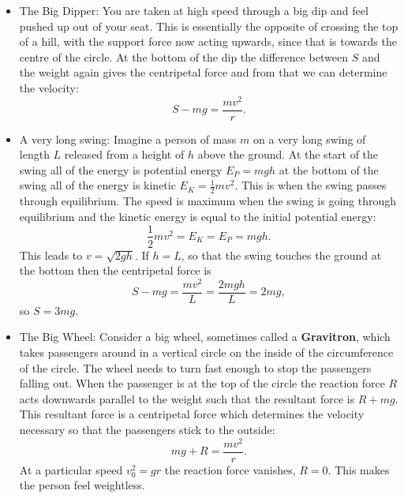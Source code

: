 \begin{itemize}
\setlength{\itemsep}{-5pt}
    \item The Big Dipper: You are taken at high speed through a big dip and feel pushed up out of your seat. This is essentially the opposite of crossing the top of a hill, with the support force now acting upwards, since that is towards the centre of the circle. At the bottom of the dip the difference between $S$ and the weight again gives the centripetal force and from that we can determine the velocity:
    \begin{equation*}
    S-mg=\frac{mv^{2}}{r}.
    \end{equation*}
    \item A very long swing: Imagine a person of mass $m$ on a very long swing of length $L$ released from a height of $h$ above the ground. At the start of the swing all of the energy is potential energy $E_{P}=mgh$ at the bottom of the swing all of the energy is kinetic $E_{K}=\frac{1}{2}mv^{2}$. This is when the swing passes through equilibrium. The speed is maximum when the swing is going through equilibrium and the kinetic energy is equal to the initial potential energy:
    \begin{equation*}
    \frac{1}{2}mv^{2}=E_{K}=E_{P}=mgh.
    \end{equation*}
This leads to $v=\sqrt{2gh}$.
If $h=L$, so that the swing touches the ground at the bottom then the centripetal force is
\begin{equation*}
S-mg=\frac{mv^{2}}{L}=\frac{2mgh}{L}=2mg,
\end{equation*}
so $S=3mg$.
\item The Big Wheel: Consider a big wheel, sometimes called a \textbf{Gravitron}, which takes passengers around in a vertical circle on the inside of the circumference of the circle. The wheel needs to turn fast enough to stop the passengers falling out. When the passenger is at the top of the circle the reaction force $R$ acts downwards parallel to the weight such that the resultant force is $R+mg$. This resultant force is a centripetal force which determines the velocity necessary so that the passengers stick to the outside:
\begin{equation*}
mg+R=\frac{mv^{2}}{r}.
\end{equation*}
At a particular speed $v_{0}^{2}=gr$ the reaction force vanishes, $R=0$. This makes the person feel weightless.
\end{itemize} 


